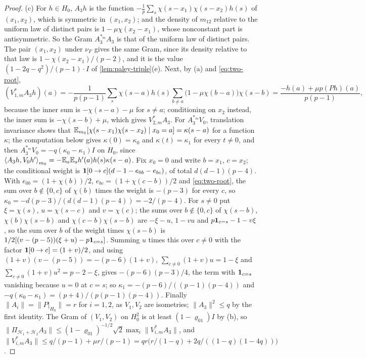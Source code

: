 \begin{proof}
(c) For $h\in H_0$, $A_3h$ is the function
$-\frac1p\sum_s\chi(s-x_1)\chi(s-x_2)h(s)$ of $(x_1,x_2)$, which is symmetric in
$(x_1,x_2)$; and the density of $m_{12}$ relative to the uniform law of
distinct pairs is $1-\mu\chi(x_2-x_1)$, whose nonconstant part is
antisymmetric. So the Gram $A_3^{*_m}A_3$ is that of the uniform law of
distinct pairs. The pair $(x_1,x_2)$ under $\nu_F$ gives the same Gram,
since its density relative to that law is $1-\chi(x_2-x_1)/(p-2)$, and it is the value
$(1-2q-q^2)/(p-1)\cdot I$ of \cref{lem:paley-triple}(e). Next, by (a) and
\eqref{eq:two-root},
\[
 (V^*_{1,m}A_3h)(a)=-\frac1{p(p-1)}\sum_s\chi(s-a)h(s)
 \sum_{b\ne a}\bigl(1-\mu\chi(b-a)\bigr)\chi(s-b)
 =\frac{-h(a)+\mu p(Ph)(a)}{p(p-1)},
\]
because the inner sum is $-\chi(s-a)-\mu$ for $s\ne a$; conditioning on $x_2$
instead, the inner sum is $-\chi(s-b)+\mu$, which gives $V^*_{2,m}A_3$. For
$A_3^{*_m}V_0$, translation invariance shows that
$\mathbb E_{m_0}[\chi(s-x_1)\chi(s-x_2)\mid x_0=a]=\kappa(s-a)$ for a function $\kappa$;
the computation below gives $\kappa(0)=\kappa_0$ and $\kappa(t)=\kappa_1$ for every
$t\ne0$, and then $A_3^{*_m}V_0=-q(\kappa_0-\kappa_1)I$ on $H_0$, since
$\left\langle A_3h,V_0h'\right\rangle_{m_0}=-\mathbb E_a\mathbb E_sh'(a)h(s)\kappa(s-a)$. Fix $x_0=0$ and write $b=x_1$,
$c=x_2$; the conditional weight is $\mathbf 1[0\to c](d-1-e_{0b}-e_{bc})$, of total
$d(d-1)(p-4)$. With $e_{0b}=(1+\chi(b))/2$, $e_{bc}=(1+\chi(c-b))/2$ and
\eqref{eq:two-root}, the sum over $b\notin\{0,c\}$ of $\chi(b)$ times the weight
is $-(p-3)$ for every $c$, so $\kappa_0=-d(p-3)/(d(d-1)(p-4))=-2/(p-4)$. For
$s\ne0$ put $\xi=\chi(s)$, $u=\chi(s-c)$ and $v=\chi(c)$; the sums over
$b\notin\{0,c\}$ of $\chi(s-b)$, $\chi(b)\chi(s-b)$ and $\chi(c-b)\chi(s-b)$ are
$-\xi-u$, $1-vu$ and $p\mathbf 1_{c=s}-1-v\xi$, so the sum over $b$ of the
weight times $\chi(s-b)$ is $1/2[(v-(p-5))(\xi+u)-p\mathbf 1_{c=s}]$. Summing
$u$ times this over $c\ne0$ with the factor $\mathbf 1[0\to c]=(1+v)/2$, and using
$(1+v)(v-(p-5))=-(p-6)(1+v)$, $\sum_{c\ne0}(1+v)u=1-\xi$ and
$\sum_{c\ne0}(1+v)u^2=p-2-\xi$, gives $-(p-6)(p-3)/4$, the term with
$\mathbf 1_{c=s}$ vanishing because $u=0$ at $c=s$; so
$\kappa_1=-(p-6)/((p-1)(p-4))$ and $-q(\kappa_0-\kappa_1)=(p+4)/(p(p-1)(p-4))$.
Finally $\|A_i\|=\|P|_{H_0}\|=r$ for $i=1,2$, as $V_1,V_2$ are isometries;
$\|A_3\|^2\le q$ by the first identity. The Gram of $(V_1,V_2)$ on $H_0^2$ is at
least $(1-\varrho_{01})I$ by (b), so
$\|\Pi_{\mathcal H_1+\mathcal H_2}A_3\|\le(1-\varrho_{01})^{-1/2}\sqrt2\max_i
\|V^*_{i,m}A_3\|$, and $\|V^*_{i,m}A_3\|\le q/(p-1)+\mu r/(p-1)=
qr\bigl(r/(1-q)+2q/((1-q)(1-4q))\bigr)$.


\end{proof}
